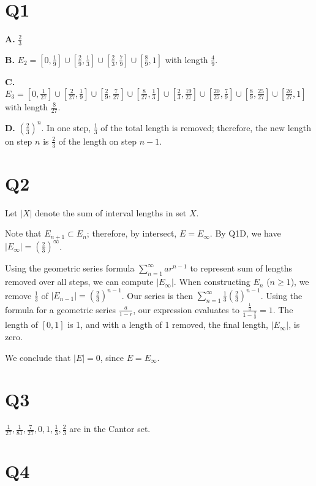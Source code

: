 \documentclass[12pt]{article}
\begin{document}
\pagebreak
\begin{outline}

\section*{Q1}

\textbf{A.} $\frac 23$

\textbf{B.} $E_2=[0,\frac 19]\cup[\frac 29,\frac 13]\cup[\frac 23,\frac 79]\cup[\frac 89,1]$
with length $\frac 49$.

\textbf{C.} $E_3=[0,\frac 1{27}]\cup[\frac2{27},\frac19]\cup[\frac29,\frac7{27}]\cup[\frac8{27},\frac13]\cup
[\frac23,\frac{19}{27}]\cup[\frac{20}{27},\frac79]\cup[\frac89,\frac{25}{27}]\cup[\frac{26}{27},1]$ with length $\frac8{27}$.

\textbf{D.} $\left(\frac23\right)^n$. In one step, $\frac13$ of the total length is removed; therefore, the new
length on step $n$ is $\frac23$ of the length on step $n-1$.

\section*{Q2}

Let $|X|$ denote the sum of interval lengths in set $X$.

Note that $E_{n+1}\subset E_n$; therefore, by intersect, $E=E_{\infty}$.
By Q1D, we have $|E_{\infty}|=\left(\frac23\right)^{\infty}$.

Using the geometric series formula $\sum_{n=1}^{\infty} ar^{n-1}$ to represent sum of lengths removed over all
steps, we can compute $|E_{\infty}|$.
When constructing $E_n$ ($n\ge1$), we remove $\frac13$ of $|E_{n-1}|=\left(\frac23\right)^{n-1}$.
Our series is then $\sum_{n=1}^{\infty} \frac13 \left(\frac23\right)^{n-1}$.
Using the formula for a geometric series $\frac{a}{1-r}$,
our expression evaluates to $\frac{\frac13}{1-\frac23}=1$. The length of $[0,1]$ is 1, and with
a length of 1 removed, the final length, $|E_{\infty}|$, is zero.

We conclude that $|E|=0$, since $E=E_{\infty}$.

\section*{Q3}

$\frac1{27},\frac1{81},\frac7{27},0,1,\frac13,\frac23$ are in the Cantor set.

\section*{Q4}


\end{outline}
\end{document}
